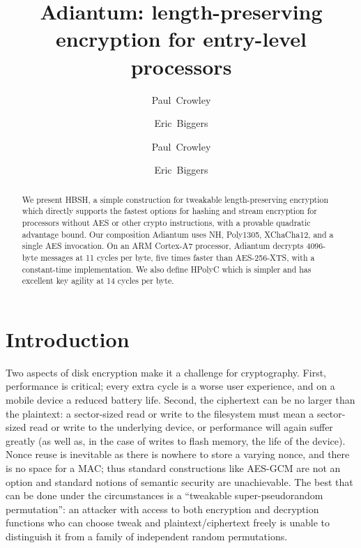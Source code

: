\documentclass[journal=tosc,preprint,floatrow,submission]{iacrtrans}
\title{{Adiantum}: length-preserving encryption for entry-level processors}
\author{Paul~Crowley \and Eric~Biggers}
\institute{Google LLC \\ \email[paulcrowley@google.com,ebiggers@google.com]{{paulcrowley,ebiggers}@google.com}}
\author{Paul~Crowley}
\author{Eric~Biggers}
\affil{Google LLC}
\begin{document}
\maketitle
\iftoggle{iacr}{
    \keywords{strong pseudorandom permutation \and
        variable input length \and
        tweakable encryption \and
        disk encryption}
}{ %
} %

\begin{abstract}
    We present HBSH, a simple construction for tweakable length-preserving encryption which
    directly supports the fastest options for hashing and stream encryption for processors
    without AES or other crypto instructions, with a provable
    quadratic advantage bound. Our composition Adiantum uses NH, Poly1305, XChaCha12,
    and a single AES invocation. On an ARM Cortex-A7 processor, Adiantum decrypts
    4096-byte messages at 11 cycles per byte, five times faster than
    AES-256-XTS, with a constant-time implementation. We also define HPolyC which is
    simpler and has excellent key agility at 14 cycles per byte.
\iftoggle{iacr}{
}{

    This paper: \url{https://ia.cr/2018/720} \\
    Source: \url{https://github.com/google/hpolyc} \\
    Email: \href{mailto:paulcrowley@google.com,ebiggers@google.com}{\{paulcrowley,ebiggers\}@google.com}
}
\end{abstract}

\section{Introduction}
Two aspects of disk encryption make it a challenge for cryptography.  First,
performance is critical; every extra cycle is a worse user experience, and on a mobile device
a reduced battery life.  Second, the ciphertext can be no larger than the plaintext: a sector-sized
read or write to the filesystem must mean a sector-sized read or write to the underlying device,
or performance will again suffer greatly
(as well as, in the case of writes to flash memory, the life of the device).
Nonce reuse is inevitable as there is nowhere to store a varying nonce, and there is no space
for a MAC; thus standard constructions like AES-GCM are not an option and standard notions
of semantic security are unachievable.  The best that can be done under the circumstances is
a ``tweakable super-pseudorandom permutation'': an attacker with access to both encryption
and decryption functions who can choose tweak and plaintext/ciphertext freely is unable to
distinguish it from a family of independent random permutations.
\end{document}
